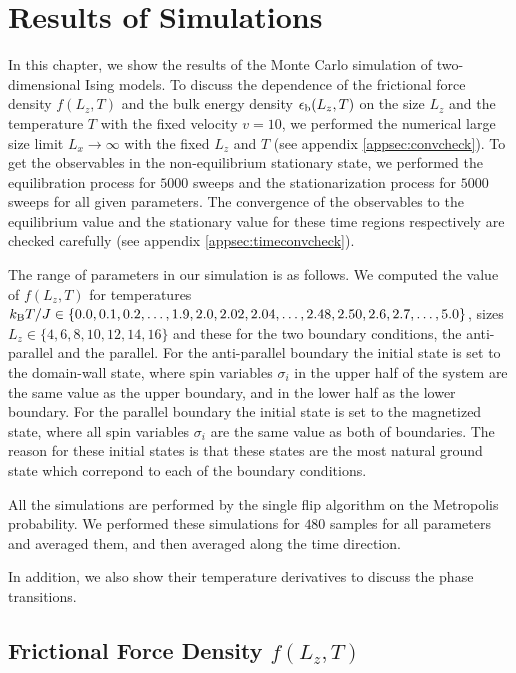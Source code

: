 \chapter{Results of Simulations}

In this chapter, we show the results of the Monte Carlo simulation of two-dimensional Ising models. To discuss the dependence of the frictional force density $f(L_{z}, T)$ and the bulk energy density $\epsilon_{\rm b}(L_{z}, T)$ on the size $L_{z}$ and the temperature $T$ with the fixed velocity $v=10$, we performed the numerical large size limit $L_{x}\to\infty$ with the fixed $L_{z}$ and $T$ (see appendix \ref{appsec:convcheck}). To get the observables in the non-equilibrium stationary state, we performed the equilibration process for $5000$ sweeps and the stationarization process for $5000$ sweeps for all given parameters. The convergence of the observables to the equilibrium value and the stationary value for these time regions respectively are checked carefully (see appendix \ref{appsec:timeconvcheck}).

The range of parameters in our simulation is as follows. We computed the value of $f(L_{z}, T)$ for temperatures $k_{\rm B}T/J\in\{0.0,0.1,0.2,\dots,1.9,2.0,2.02,2.04,\dots,2.48,2.50,2.6,2.7,\dots,5.0\}$, sizes $L_{z}\in\{4,6,8,10,12,14,16\}$ and these for the two boundary conditions, the  anti-parallel and the parallel. For the anti-parallel boundary the initial state is set to the domain-wall state, where spin variables $\sigma_{i}$ in the upper half of the system are the same value as the upper boundary, and in the lower half as the lower boundary. For the parallel boundary the initial state is set to the magnetized state, where all spin variables $\sigma_{i}$ are the same value as both of boundaries. The reason for these initial states is that these states are the most natural ground state which correpond to each of the boundary conditions.

All the simulations are performed by the single flip algorithm on the Metropolis probability. We performed these simulations for $480$ samples for all parameters and averaged them, and then averaged along the time direction.

In addition, we also show their temperature derivatives to discuss the phase transitions.

\section{Frictional Force Density $f(L_{z}, T)$}

